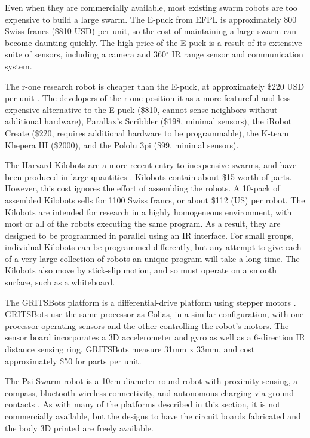 Even when they are commercially available, most existing swarm robots are too expensive to build a large swarm.
The E-puck from EFPL is approximately 800 Swiss francs (\$810 USD) per unit, so the cost of maintaining a large swarm can become daunting quickly. 
The high price of the E-puck is a result of its extensive suite of sensors, including a camera and 360$^{\circ}$ IR range sensor and communication system. 

The r-one research robot is cheaper than the E-puck, at approximately \$220 USD per unit \citep{mclurkin2013low}. 
The developers of the r-one position it as a more featureful and less expensive alternative to the E-puck (\$810, cannot sense neighbors without additional hardware), Parallax's Scribbler (\$198, minimal sensors), the iRobot Create (\$220, requires additional hardware to be programmable), the K-team Khepera III (\$2000), and the Pololu 3pi (\$99, minimal sensors). 

The Harvard Kilobots are a more recent entry to inexpensive swarms, and have been produced in large quantities \citep{rubenstein2014kilobot}. 
Kilobots contain about \$15 worth of parts. 
However, this cost ignores the effort of assembling the robots. 
A 10-pack of assembled Kilobots sells for 1100 Swiss francs, or about \$112 (US) per robot. 
The Kilobots are intended for research in a highly homogeneous environment, with most or all of the robots executing the same program. 
As a result, they are designed to be programmed in parallel using an IR interface. 
For small groups, individual Kilobots can be programmed differently, but any attempt to give each of a very large collection of robots an unique program will take a long time. 
The Kilobots also move by stick-slip motion, and so must operate on a smooth surface, such as a whiteboard. 

The GRITSBots platform is a differential-drive platform using stepper motors \citep{pickem2015gritsbot}.
GRITSBots use the same processor as Colias, in a similar configuration, with one processor operating sensors and the other controlling the robot's motors. 
The sensor board incorporates a 3D accelerometer and gyro as well as a 6-direction IR distance sensing ring. 
GRITSBots measure 31mm x 33mm, and cost approximately \$50 for parts per unit. 

The Psi Swarm robot is a 10cm diameter round robot with proximity sensing, a compass, bluetooth wireless connectivity, and autonomous charging via ground contacts \citep{hilder2016psi}.
As with many of the platforms described in this section, it is not commercially available, but the designs to have the circuit boards fabricated and the body 3D printed are freely available. 

